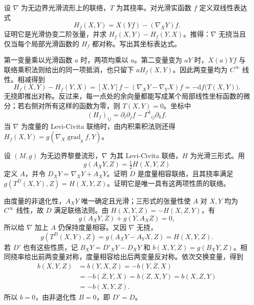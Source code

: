\begin{exercise}\label{g3:ex:hessian-torsion}
	设 \(\nabla\) 为无边界光滑流形上的联络，\(T\) 为其挠率。对光滑实函数 \(f\) 定义双线性表达式
	\[
		H_f(X,Y)=X(Yf)-(\nabla_XY)f.
	\]
	证明它是光滑协变二阶张量，并求 \(H_f(X,Y)-H_f(Y,X)\)。推得：\(\nabla\) 无挠当且仅当每个局部光滑函数的 \(H_f\) 都对称。写出其坐标表达式。
\end{exercise}
\begin{solution}
	第一变量乘以光滑函数 \(a\) 时，两项均乘以 \(a\)。第二变量变为 \(aY\) 时，\(X(a)Yf\) 与联络乘积法则给出的同一项抵消，也只留下 \(aH_f(X,Y)\)。因此两变量均为 \(C^\infty\) 线性。相减得到
	\[
		H_f(X,Y)-H_f(Y,X)
		=[X,Y]f-(\nabla_XY-\nabla_YX)f
		=-\mathrm df\bigl(T(X,Y)\bigr).
	\]
	无挠即推出对称。反过来，每一点处的余向量都能写成某个局部线性坐标函数的微分；若右侧对所有这样的函数为零，则 \(T(X,Y)=0\)。坐标中
	\[
		(H_f)_{ij}=\partial_i\partial_jf-\Gamma^k{}_{ij}\partial_kf.
	\]
	当 \(\nabla\) 为度量的 Levi-Civita 联络时，由内积乘积法则还得 \(H_f(X,Y)=g(\nabla_X\operatorname{grad}_g f,Y)\)。
\end{solution}

\begin{exercise}\label{g3:ex:metric-connection-three-form}
	设 \((M,g)\) 为无边界黎曼流形，\(\nabla\) 为其 Levi-Civita 联络，\(H\) 为光滑三形式。用
	\[
		g(A_XY,Z)=\tfrac12H(X,Y,Z)
	\]
	定义 \(A\)，并令 \(D_XY=\nabla_XY+A_XY\)。证明 \(D\) 是度量相容联络，且其挠率满足 \(g(T^D(X,Y),Z)=H(X,Y,Z)\)。证明它是唯一具有这两项性质的联络。
\end{exercise}
\begin{solution}
	由度量的非退化性，\(A_XY\) 唯一确定且光滑；三形式的张量性使 \(A\) 对 \(X,Y\) 均为 \(C^\infty\) 线性，故 \(D\) 满足联络法则。由 \(H(X,Y,Z)=-H(X,Z,Y)\)，有
	\[
		g(A_XY,Z)+g(Y,A_XZ)=0,
	\]
	所以给 \(\nabla\) 加上 \(A\) 仍保持度量相容。又因 \(\nabla\) 无挠，
	\[
		g(T^D(X,Y),Z)
		=g(A_XY-A_YX,Z)=H(X,Y,Z).
	\]
	若 \(D'\) 也有这些性质，记 \(B_XY=D'_XY-D_XY\) 和 \(b(X,Y,Z)=g(B_XY,Z)\)。相同挠率给出前两变量对称，度量相容给出后两变量反对称。依次交换变量，得到
	\[
		\begin{aligned}
			b(X,Y,Z)&=b(Y,X,Z)=-b(Y,Z,X)\\
			&=-b(Z,Y,X)=b(Z,X,Y)=b(X,Z,Y)\\
			&=-b(X,Y,Z).
		\end{aligned}
	\]
	所以 \(b=0\)，由非退化性 \(B=0\)，即 \(D'=D\)。
\end{solution}

